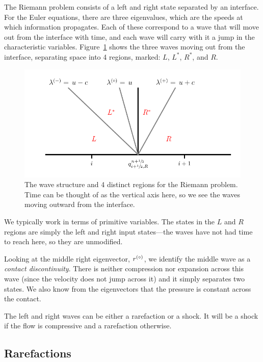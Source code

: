 The Riemann problem consists of a left and right state separated by an
interface.  For the Euler equations, there are three eigenvalues,
which are the speeds at which information propagates.  Each of these
correspond to a wave that will move out from the interface with time,
and each wave will carry with it a jump in the characteristic
variables.  Figure~\ref{fig:riemann:waves} shows the
three waves moving out from the interface, separating space into 4
regions, marked: $L$, $L^*$, $R^*$, and $R$.
\begin{figure}[h]
\centering
\includegraphics[width=\linewidth]{riemann-waves}
\caption[The Riemann problem wave structure for the Euler
  equations]{\label{fig:riemann:waves} The wave structure and 4
  distinct regions for the Riemann problem.  Time can be thought of as
  the vertical axis here, so we see the waves moving outward from the
  interface.}
\end{figure}
We typically work in terms of primitive variables.  The states in the
$L$ and $R$ regions are simply the left and right input states---the
waves have not had time to reach here, so they are unmodified.

Looking at the middle right eigenvector, $r^{(\circ)}$, we identify the
middle wave as a {\em contact discontinuity}.  There is neither
compression nor expansion across this wave (since the velocity does
not jump across it) and it simply separates two states.  We also know
from the eigenvectors that the pressure is constant across the
contact.

The left and right waves can be either a rarefaction or a shock.  It will
be a shock if the flow is compressive and a rarefaction otherwise.


\subsection{Rarefactions}

